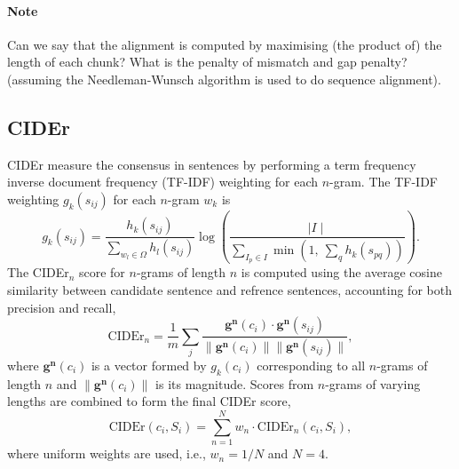 {\it
\paragraph{Note}
Can we say that the alignment is computed by maximising (the product of) the length of each chunk?
What is the penalty of mismatch and gap penalty? (assuming the Needleman-Wunsch algorithm is used to do sequence alignment).
}


\subsection{CIDEr}

CIDEr measure the consensus in sentences by performing a term frequency inverse document frequency (TF-IDF) weighting for each $n$-gram.
The TF-IDF weighting $g_k(s_{ij})$ for each $n$-gram $w_k$ is
\begin{equation*}
g_k(s_{ij}) = \frac{h_k(s_{ij})} {\sum_{w_l \in \Omega} h_l(s_{ij})} 
              \log \left( \frac{\mid I \mid} {\sum_{I_p \in I} \min\left( 1,~ \sum_q h_k(s_{pq}) \right)} \right).
\end{equation*}
The CIDEr$_n$ score for $n$-grams of length $n$ is computed using the average cosine similarity between candidate sentence and refrence sentences,
accounting for both precision and recall,
\begin{equation*}
\text{CIDEr}_n = 
\frac{1}{m} \sum_j 
\frac{\mathbf{g}^\mathbf{n}(c_i) \cdot \mathbf{g}^\mathbf{n}(s_{ij})} {\|\mathbf{g}^\mathbf{n}(c_i)\| \|\mathbf{g}^\mathbf{n}(s_{ij})\|},
\end{equation*}
where $\mathbf{g}^\mathbf{n}(c_i)$ is a vector formed by $g_k(c_i)$ corresponding to all $n$-grams of length $n$ and 
$\|\mathbf{g}^\mathbf{n}(c_i)\|$ is its magnitude. Scores from $n$-grams of varying lengths are combined to form the final CIDEr score,
\begin{equation*}
\text{CIDEr}(c_i, S_i) = \sum_{n=1}^N w_n \cdot \text{CIDEr}_n(c_i, S_i),
\end{equation*}
where uniform weights are used, i.e., $w_n = 1/N$ and $N=4$.

